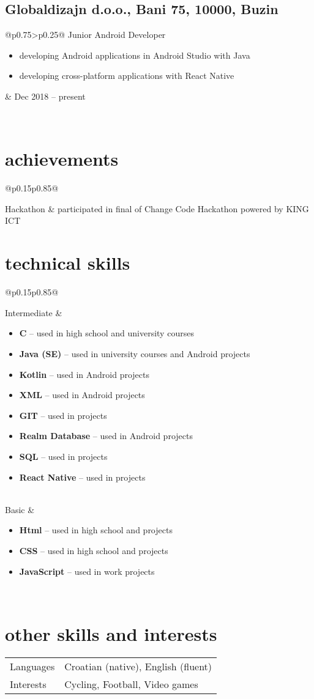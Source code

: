 \documentclass[a4paper]{article}
\makeatletter
\newlength{\tablewidth}
\newenvironment{period}[2]{%
\newcommand{\sarma}{#2}%
\setlength{\tablewidth}{\linewidth}
\addtolength{\tablewidth}{-2\tabcolsep}
\begin{tabular}{@{}p{0.75\tablewidth}>{\raggedleft\arraybackslash}p{0.25\tablewidth}@{}}%
#1 \newline
\begin{itemize}
}{%
\end{itemize} & \sarma \\%
\end{tabular}\\
}
\newenvironment{skills}{%
\setlength{\tablewidth}{\linewidth}
\addtolength{\tablewidth}{-2\tabcolsep}
\begin{tabular}{@{}p{0.15\tablewidth}p{0.85\tablewidth}@{}}
}{%
\end{tabular}
}
\makeatother
\begin{document}
\subsection{Globaldizajn d.o.o., Bani 75, 10000, Buzin }
\begin{period}{Junior Android Developer}{Dec 2018 -- present}
    \item developing Android applications in Android Studio with Java
    \item developing cross-platform applications with React Native
\end{period}

\section{achievements}
\begin{skills}
    Hackathon   &   participated in final of Change Code Hackathon powered by KING ICT\end{skills}

\section{technical skills}
\begin{skills}
    Intermediate &
    \begin{itemize}
    	\item \textbf{C} -- used in high school and university courses
        \item \textbf{Java (SE)} -- used in university courses and Android projects
        \item \textbf{Kotlin} -- used in Android projects
        \item \textbf{XML} -- used in Android projects
        \item \textbf{GIT} -- used in projects
        \item \textbf{Realm Database} -- used in Android projects
        \item \textbf{SQL} -- used in projects
        \item \textbf{React Native} -- used in projects
    \end{itemize} \\
    Basic &
    \begin{itemize}
        \item \textbf{Html} -- used in high school and projects
        \item \textbf{CSS} -- used in high school and projects
        \item \textbf{JavaScript} -- used in work projects
    \end{itemize} \\
\end{skills}

\section{other skills and interests}
\begin{skills}
    Languages & Croatian (native), English (fluent)\\
    Interests & Cycling, Football, Video games \\
\end{skills}
\end{document}
